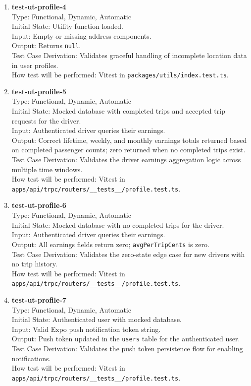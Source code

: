 \documentclass[12pt, titlepage]{article}
\begin{document}
\begin{enumerate}
\item \textbf{test-ut-profile-4}\\
Type: Functional, Dynamic, Automatic\\
Initial State: Utility function loaded.\\
Input: Empty or missing address components.\\
Output: Returns \texttt{null}.\\
Test Case Derivation: Validates graceful handling of incomplete location data in user profiles.\\
How test will be performed: Vitest in \texttt{packages/utils/index.test.ts}.\\

\item \textbf{test-ut-profile-5}\\
Type: Functional, Dynamic, Automatic\\
Initial State: Mocked database with completed trips and accepted trip requests for the driver.\\
Input: Authenticated driver queries their earnings.\\
Output: Correct lifetime, weekly, and monthly earnings totals returned based on completed passenger counts; zero returned when no completed trips exist.\\
Test Case Derivation: Validates the driver earnings aggregation logic across multiple time windows.\\
How test will be performed: Vitest in \texttt{apps/api/trpc/routers/\_\_tests\_\_/profile.test.ts}.\\

\item \textbf{test-ut-profile-6}\\
Type: Functional, Dynamic, Automatic\\
Initial State: Mocked database with no completed trips for the driver.\\
Input: Authenticated driver queries their earnings.\\
Output: All earnings fields return zero; \texttt{avgPerTripCents} is zero.\\
Test Case Derivation: Validates the zero-state edge case for new drivers with no trip history.\\
How test will be performed: Vitest in \texttt{apps/api/trpc/routers/\_\_tests\_\_/profile.test.ts}.\\

\item \textbf{test-ut-profile-7}\\
Type: Functional, Dynamic, Automatic\\
Initial State: Authenticated user with mocked database.\\
Input: Valid Expo push notification token string.\\
Output: Push token updated in the \texttt{users} table for the authenticated user.\\
Test Case Derivation: Validates the push token persistence flow for enabling notifications.\\
How test will be performed: Vitest in \texttt{apps/api/trpc/routers/\_\_tests\_\_/profile.test.ts}.\\


\end{enumerate}
\end{document}
